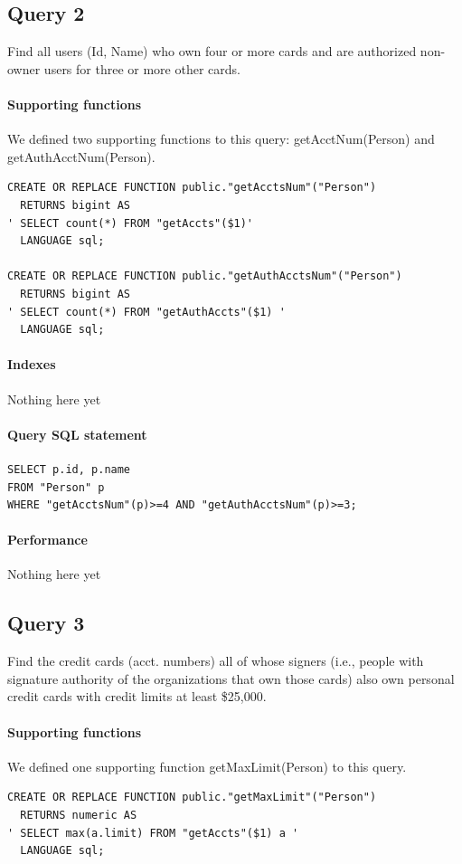 \documentclass[11pt]{article}
\begin{document}
\subsection{Query 2}
Find all users (Id, Name) who own four or more cards and are authorized non-owner users for three or more other cards.

\paragraph{Supporting functions} We defined two supporting functions to this query: getAcctNum(Person) and getAuthAcctNum(Person).
\begin{verbatim}
CREATE OR REPLACE FUNCTION public."getAcctsNum"("Person")
  RETURNS bigint AS
' SELECT count(*) FROM "getAccts"($1)'
  LANGUAGE sql;

CREATE OR REPLACE FUNCTION public."getAuthAcctsNum"("Person")
  RETURNS bigint AS
' SELECT count(*) FROM "getAuthAccts"($1) '
  LANGUAGE sql;
\end{verbatim}

\paragraph{Indexes} Nothing here yet

\paragraph{Query SQL statement}
\begin{verbatim}
SELECT p.id, p.name
FROM "Person" p
WHERE "getAcctsNum"(p)>=4 AND "getAuthAcctsNum"(p)>=3;
\end{verbatim}

\paragraph{Performance} Nothing here yet

\subsection{Query 3}
Find the credit cards (acct. numbers) all of whose signers (i.e., people with signature authority of the organizations that own those cards) also own personal credit cards with credit limits at least \$25,000.

\paragraph{Supporting functions} We defined one supporting function getMaxLimit(Person) to this query.
\begin{verbatim}
CREATE OR REPLACE FUNCTION public."getMaxLimit"("Person")
  RETURNS numeric AS
' SELECT max(a.limit) FROM "getAccts"($1) a '
  LANGUAGE sql;
\end{verbatim}
\end{document}
